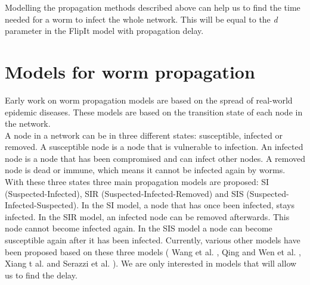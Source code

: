 \begin{description}
\end{description}

 Modelling the propagation methods described above can help us to find the time needed for a worm to infect the whole network. This will be equal to the \textit{d} parameter in the FlipIt model with propagation delay. \\

\section{Models for worm propagation}
\label{modelsforpropagation}
Early work on worm propagation models are based on the spread of real-world epidemic diseases. These models are based on the transition state of each node in the network.\\

A node in a network can be in three different states: susceptible, infected or removed. A susceptible node is a node that is vulnerable to infection. An infected node is a node that has been compromised and can infect other nodes. A removed node is dead or immune, which means it cannot be infected again by worms. With these three states three main propagation models are proposed: SI (Suspected-Infected), SIR (Suspected-Infected-Removed) and SIS (Suspected-Infected-Suspected). In the SI model, a node that has once been infected, stays infected. In the SIR model, an infected node can be removed afterwards. This node cannot become infected again. In the SIS model a node can become susceptible again after it has been infected. Currently, various other models have been proposed based on these three models ( Wang et al. \cite{wang2014modeling}, Qing and Wen et al. \cite{OnWorms2005survey}, Xiang t al. \cite{xiang2009propagation} and Serazzi et al. \cite{serazzi2004computer}). We are only interested in models that will allow us to find the delay. \\ 


